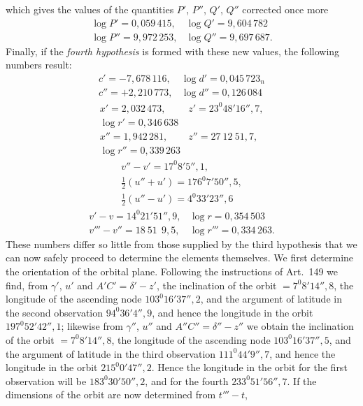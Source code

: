 which gives the values of the quantities $P'$, $P''$, $Q'$, $Q''$ corrected once more
\[
\begin{array}{ll}
\log P' = 0{,}059\,415, & \log Q' = 9{,}604\,782 \\
\log P'' = 9{,}972\,253, & \log Q'' = 9{,}697\,687.
\end{array}
\]
Finally, if the \emph{fourth hypothesis} is formed with these new values, the following numbers
result:
\[
\begin{array}{ll}
c' = -7{,}678\,116, & \log d' = 0{,}045\,723_n \\
c'' = +2{,}210\,773, & \log d'' = 0{,}126\,084
\end{array}
\]
\[
\begin{array}{ll}
x' = 2{,}032\,473, & z' = 23^{0}48'16''{,}7,\\
\log r' = 0{,}346\,638 & \\
x'' = 1{,}942\,281, & z'' = 27\ 12\ 51{,}7,\\
\log r'' = 0{,}339\,263 & 
\end{array}
\]
\[
\begin{gathered}
v''-v' = 17^{0}8'5''{,}1, \\ \tfrac{1}{2}(u''+u') = 176^{0}7'50''{,}5, \\
\tfrac{1}{2}(u''-u') = 4^{0}33'23''{,}6
\end{gathered}
\]
\[
\begin{array}{ll}
v'-v = 14^{0}21'51''{,}9, & \log r = 0{,}354\,503 \\
v'''-v'' = 18\ 51\ \ 9{,}5, & \log r''' = 0{,}334\,263.
\end{array}
\]
These numbers differ so little from those supplied by the third hypothesis
that we can now safely proceed to determine the elements themselves.
We first determine the orientation of the orbital plane. Following the instructions of Art.\ 149
we find, from $\gamma'$, $u'$ and $A'C' = \delta'-z'$, the inclination of the orbit
$= 7^{0}8'14''{,}8$, the longitude of the ascending node $103^{0}16'37''{,}2$, and the argument
of latitude in the second observation $94^{0}36'4''{,}9$, and hence the longitude in the orbit $197^{0}52'42''{,}1$; likewise from $\gamma''$, $u''$
and $A''C'' = \delta''-z''$ we obtain the inclination of the orbit $= 7^{0}8'14''{,}8$,
the longitude of the ascending node $103^{0}16'37''{,}5$, and the argument of latitude in
the third observation $111^{0}44'9''{,}7$, and hence the longitude in the orbit
$215^{0}0'47''{,}2$. Hence the longitude in the orbit for the first observation will be
$183^{0}30'50''{,}2$, and for the fourth $233^{0}51'56''{,}7$. If the dimensions of the orbit are now determined from $t'''-t$,
